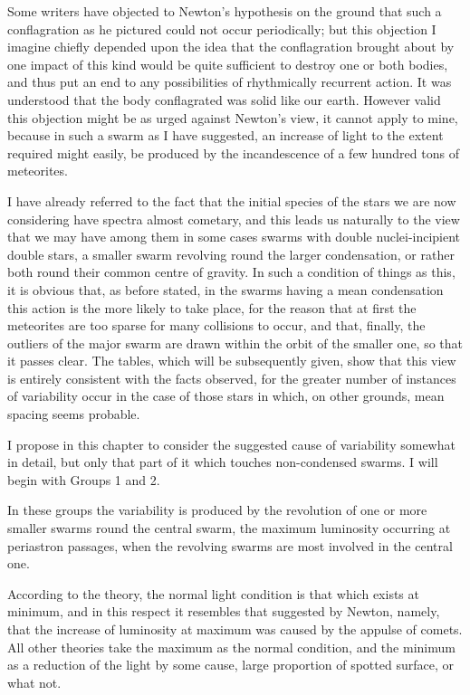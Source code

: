 \documentclass[a4paper, 12pt, oneside, polutonikogreek, english]{article}
\begin{document}
Some writers have objected to Newton's hypothesis on the ground that such a conflagration as he pictured could not occur periodically; but this objection I imagine chiefly depended upon the idea that the conflagration brought about by one impact of this kind would be quite sufficient to destroy one or both bodies, and thus put an end to any possibilities of rhythmically recurrent action. It was understood that the body conflagrated was solid like our earth. However valid this objection might be as urged against Newton's view, it cannot apply to mine, because in such a swarm as I have suggested, an increase of light to the extent required might easily, be produced by the incandescence of a few hundred tons of meteorites.

I have already referred to the fact that the initial species of the stars we are now considering have spectra almost cometary, and this leads us naturally to the view that we may have among them in some cases swarms with double nuclei-incipient double stars, a smaller swarm revolving round the larger condensation, or rather both round their common centre of gravity. In such a condition of things as this, it is obvious that, as before stated, in the swarms having a mean condensation this action is the more likely to take place, for the reason that at first the meteorites are too sparse for many collisions to occur, and that, finally, the outliers of the major swarm are drawn within the orbit of the smaller one, so that it passes clear. The tables, which will be subsequently given, show that this view is entirely consistent with the facts observed, for the greater number of instances of variability occur in the case of those stars in which, on other grounds, mean spacing seems probable.

I propose in this chapter to consider the suggested cause of variability somewhat in detail, but only that part of it which touches non-condensed swarms. I will begin with Groups 1 and 2.

In these groups the variability is produced by the revolution of one or more smaller swarms round the central swarm, the maximum luminosity occurring at periastron passages, when the revolving swarms are most involved in the central one.

According to the theory, the normal light condition is that which exists at minimum, and in this respect it resembles that suggested by Newton, namely, that the increase of luminosity at maximum was caused by the appulse of comets. All other theories take the maximum as the normal condition, and the minimum as a reduction of the light by some cause, large proportion of spotted surface, or what not.
\end{document}

